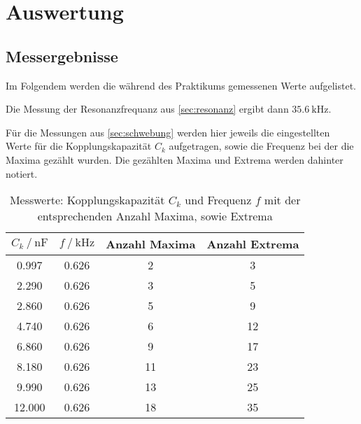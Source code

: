 \section{Auswertung}
\label{sec:Auswertung}




\subsection{Messergebnisse}

Im Folgendem werden die während des Praktikums gemessenen Werte aufgelistet.

Die Messung der Resonanzfrequanz aus \autoref{sec:resonanz} ergibt dann $\SI{35.6}{\kilo\hertz}$.

Für die Messungen aus \autoref{sec:schwebung} werden hier jeweils die eingestellten Werte für die Kopplungskapazität $C_k$ aufgetragen, sowie die Frequenz bei der die Maxima gezählt wurden. Die gezählten Maxima und Extrema werden dahinter notiert. 

\begin{table}
  \centering
  \caption{Messwerte: Kopplungskapazität $C_k $ und Frequenz $f$ mit der entsprechenden Anzahl Maxima, sowie Extrema}
  \label{tab:schwebung}
  \begin{tabular}{c c c c}
    \toprule 
    $C_k \:/\: \si{\nano\farad}$ & $f \:/\: \si{\kilo\hertz}$ & Anzahl Maxima &  Anzahl Extrema   \\ 
    \midrule 
    0.997 & 0.626 & 2 & 3 \\
    2.290 & 0.626 & 3 & 5 \\
    2.860 & 0.626 & 5 & 9 \\
    4.740 & 0.626 & 6 & 12 \\
    6.860 & 0.626 & 9 & 17 \\
    8.180 & 0.626 & 11 & 23 \\
    9.990 & 0.626 & 13 & 25 \\
    12.000 & 0.626 & 18 & 35 \\
    \bottomrule
  \end{tabular}
\end{table}

